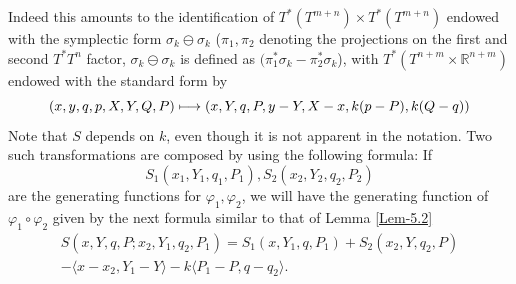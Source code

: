 \documentclass[JEP,XML,SOM,NoFloatCountersInSection,Unicode,published]{cedram}
\newcommand\mto{\mathchoice{\longmapsto}{\mapsto}{\mapsto}{\mapsto}}
\numberwithin{equation}{section}
\let \phi \varphi
\theoremstyle{plain}
\theoremstyle{definition}
\theoremstyle{remark}
\begin{document}
Indeed this amounts to the identification of $T^*(T^{m+n})\times T^*(T^{m+n})$ endowed with the symplectic form $\sigma_{k} \ominus \sigma_{k}$ (\ie $\pi_{1},\pi_{2}$ denoting the projections on the first and second $T^*T^n$ factor, $\sigma_{k} \ominus \sigma_{k}$ is defined as $(\pi_{1}^*\sigma_{k}-\pi_{2}^*\sigma_{k}$), with $T^*(T^{n+m}\times {\mathbb R} ^{n+m})$ endowed with the standard form by
\[
(x,y,q,p,X,Y,Q,P) \mto (x,Y,q,P, y-Y,X-x,k(p-P),k(Q-q))
\]
Note that $S$ depends on $k$, even though it is not apparent in the notation.
Two such transformations are composed by using the following formula: If
\[
S_{1}(x_{1},Y_{1},q_{1},P_{1}), S_{2}(x_{2},Y_{2},q_{2},P_{2})
\]
are the generating functions for $\phi_1, \phi_2$, we will have the generating function of $\varphi_1\circ \varphi_2$ given by the next formula similar to that of Lemma \ref{Lem-5.2}
\begin{multline*}
S(x,Y,q,P; x_{2},Y_{1},q_{2},P_{1})=S_{1}(x,Y_{1},q,P_{1})+ S_{2}(x_{2},Y,q_{2},P)\\
-\langle x-x_{2},Y_{1}-Y \rangle
- k \langle P_{1}-P,q-q_{2} \rangle.
\end{multline*}
\end{document}
